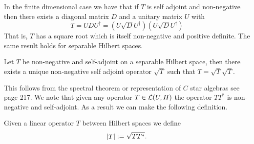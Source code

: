 \documentclass[
    a4paper,
    DIV=14,
    abstract=true,
    numbers=noenddot
]{scrartcl}
\begin{document}
In the finite dimensional case we have that if $T$ is self adjoint and non-negative then there exists a diagonal matrix $D$ and a unitary matrix $U$ with
\begin{equation*}
	T=UDU^\dagger=(U\sqrt{D}U^\dagger)(U\sqrt{D}U^\dagger)
\end{equation*}
That is, $T$ has a square root which is itself non-negative and positive definite. The same result holds for separable Hilbert spaces.
\begin{theorem}
	Let $T$ be non-negative and self-adjoint on a separable Hilbert space, then there exists a unique non-negative self adjoint operator $\sqrt{T}$ such that $T=\sqrt{T}\sqrt{T}$.
\end{theorem}
This follows from the spectral theorem or representation of $C$ star algebras see \cite{lototsky2017stochastic} page 217. We note that given any operator $T\in \mathcal{L}(U,H)$ the operator $TT^*$ is non-negative and self-adjoint. As a result we can make the following definition.
\begin{definition}
	Given a linear operator $T$ between Hilbert spaces we define
	\begin{equation*}
		\left| T \right|:=\sqrt{T T^*}  .
	\end{equation*}

\end{definition}
\end{document}
